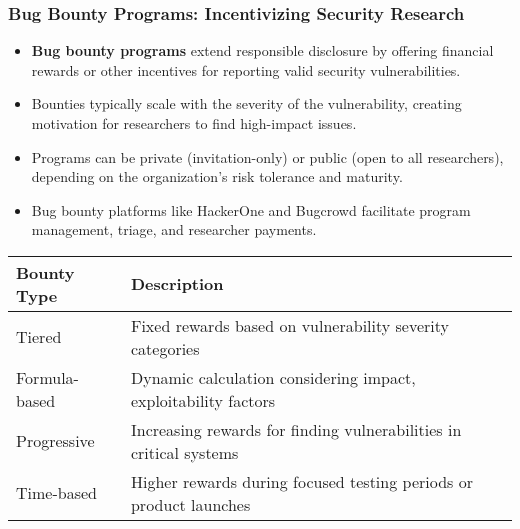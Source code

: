 \documentclass{beamer}
\begin{document}
\begin{frame}
\frametitle{Bug Bounty Programs: Incentivizing Security Research}
\begin{itemize}
\item \textbf{Bug bounty programs} extend responsible disclosure by offering financial rewards or other incentives for reporting valid security vulnerabilities.
\item Bounties typically scale with the severity of the vulnerability, creating motivation for researchers to find high-impact issues.
\item Programs can be private (invitation-only) or public (open to all researchers), depending on the organization's risk tolerance and maturity.
\item Bug bounty platforms like HackerOne and Bugcrowd facilitate program management, triage, and researcher payments.
\end{itemize}

\begin{table}
\scriptsize
\centering
\begin{tabular}{p{3cm}p{8cm}}
\toprule
\textbf{Bounty Type} & \textbf{Description} \\
\midrule
Tiered & Fixed rewards based on vulnerability severity categories \\
Formula-based & Dynamic calculation considering impact, exploitability factors \\
Progressive & Increasing rewards for finding vulnerabilities in critical systems \\
Time-based & Higher rewards during focused testing periods or product launches \\
\bottomrule
\end{tabular}
\end{table}
\end{frame}
\end{document}
